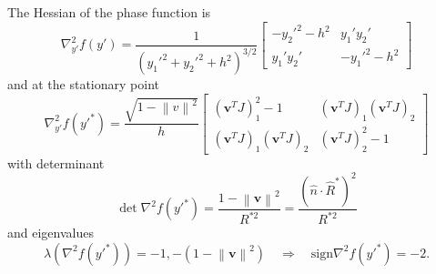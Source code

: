 \documentclass{article}
\newcommand{\norm}[1]{\left\lVert #1 \right\rVert}
\theoremstyle{plain}
\begin{document}
The Hessian of the phase function is
\begin{equation}
	\nabla^2_{y'} f(y') =
	\frac{1}{ \left( y_1'^{2} + y_2'^{2} + h^2 \right)^{3/2}}
	\begin{bmatrix}
		-y_2'^{2} - h^2 & y_1'y_2' \\
		y_1'y_2' & -y_1'^{2} - h^2 
	\end{bmatrix}
\end{equation}
and at the stationary point
\begin{equation}
	\nabla^2_{y'} f(y'^{*}) =
	\frac{\sqrt{1-\norm{v}^2}}{h}
	\begin{bmatrix}
		(\mathbf{v}^TJ)_1^2 - 1 & (\mathbf{v}^TJ)_1(\mathbf{v}^TJ)_2 \\
		(\mathbf{v}^TJ)_1(\mathbf{v}^TJ)_2 & (\mathbf{v}^TJ)_2^2 - 1
	\end{bmatrix}
\end{equation}
with determinant
\begin{equation}
	\det \nabla^2 f(y'^{*})
	= \frac{1-\norm{\mathbf{v}}^2}{R^{*2}}
	= \frac{\left(\hat{n}\cdot\hat{R}^*\right)^2}{R^{*2}}
\end{equation}
and eigenvalues
\begin{equation}
	\lambda\left( \nabla^2 f(y'^{*}) \right) = 
	-1, -\left( 1-\norm{\mathbf{v}}^2 \right)
	\quad\Rightarrow\quad \text{sign}\nabla^2 f(y'^{*}) = -2.
\end{equation}
\end{document}
